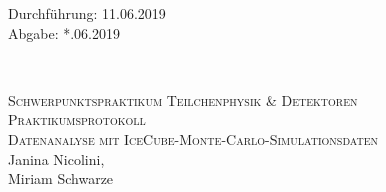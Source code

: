



\begin{titlepage}
  \begin{flushleft}
 Durchführung: 11.06.2019\\
 Abgabe: *.06.2019
  \end{flushleft}


\HRule\\[1,0cm]

 \begin{center}


  \textsc{\Large Schwerpunktspraktikum Teilchenphysik \& Detektoren}\\[1.5cm]
  \textsc{\LARGE Praktikumsprotokoll}\\[1.5cm]
\textsc{\huge Datenanalyse mit IceCube-Monte-Carlo-Simulationsdaten} \\[5,5cm]

Janina Nicolini\footnotemark[1], \\
Miriam Schwarze\footnotemark[2] \\[1,0cm]



 \end{center}
\HRule

 \vfill

\end{titlepage}






\printbibliography


